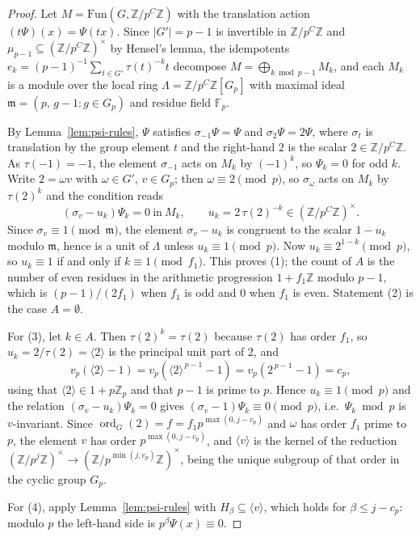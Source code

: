 \documentclass[a4paper]{article}
\newcommand{\F}{\mathbb{F}}
\newcommand{\Z}{\mathbb{Z}}
\newcommand{\ord}[2][]{\operatorname{ord}_{#1}\!\left(#2\right)}
\newcommand{\abs}[1]{\left|#1\right|}
\begin{document}
\begin{proof}
	Let $M=\mathrm{Fun}(G,\Z/p^{C}\Z)$ with the translation action
	$(t\Psi)(x)=\Psi(tx)$.  Since $\abs{G'}=p-1$ is invertible in
	$\Z/p^{C}\Z$ and $\mu_{p-1}\subseteq(\Z/p^{C}\Z)^{\times}$ by Hensel's
	lemma, the idempotents
	$e_k=(p-1)^{-1}\sum_{t\in G'}\tau(t)^{-k}t$ decompose
	$M=\bigoplus_{k\bmod p-1}M_k$, and each $M_k$ is a module over the
	local ring $\Lambda=\Z/p^{C}\Z[G_p]$ with maximal ideal
	$\mathfrak m=(p,\,g-1:g\in G_p)$ and residue field $\F_p$.

	By Lemma~\ref{lem:psi-rules}, $\Psi$ satisfies $\sigma_{-1}\Psi=\Psi$
	and $\sigma_2\Psi=2\Psi$, where $\sigma_t$ is translation by the group
	element $t$ and the right-hand $2$ is the scalar $2\in\Z/p^{C}\Z$.
	As $\tau(-1)=-1$, the element $\sigma_{-1}$ acts on $M_k$ by
	$(-1)^{k}$, so $\Psi_k=0$ for odd $k$.
	Write $2=\omega v$ with $\omega\in G'$, $v\in G_p$; then
	$\omega\equiv2\pmod p$, so $\sigma_\omega$ acts on $M_k$ by
	$\tau(2)^{k}$ and the condition reads
	\[
		\left(\sigma_v-u_k\right)\Psi_k=0\ \text{in}\ M_k,
		\qquad u_k=2\,\tau(2)^{-k}\in(\Z/p^{C}\Z)^{\times}.
	\]
	Since $\sigma_v\equiv1\pmod{\mathfrak m}$, the element
	$\sigma_v-u_k$ is congruent
	to the scalar $1-u_k$ modulo $\mathfrak m$, hence is a unit of
	$\Lambda$ unless $u_k\equiv1\pmod p$.
	Now $u_k\equiv2^{1-k}\pmod p$, so $u_k\equiv1$ if and only if
	$k\equiv1\pmod{f_1}$.  This proves (1); the count of $A$ is the number
	of even residues in the arithmetic progression $1+f_1\Z$ modulo
	$p-1$, which is $(p-1)/(2f_1)$ when $f_1$ is odd and $0$ when $f_1$ is
	even.  Statement (2) is the case $A=\emptyset$.

	For (3), let $k\in A$.  Then $\tau(2)^{k}=\tau(2)$ because $\tau(2)$
	has order $f_1$, so $u_k=2/\tau(2)=\langle2\rangle$ is the principal
	unit part of $2$, and
	\[
		v_p\!\left(\langle2\rangle-1\right)
		=v_p\!\left(\langle2\rangle^{\,p-1}-1\right)
		=v_p\!\left(2^{\,p-1}-1\right)=c_p ,
	\]
	using that $\langle2\rangle\in1+p\Z_p$ and that $p-1$ is prime to $p$.
	Hence $u_k\equiv1\pmod p$ and the relation
	$(\sigma_v-u_k)\Psi_k=0$ gives
	$(\sigma_v-1)\Psi_k\equiv0\pmod p$, i.e.\ $\Psi_k\bmod p$ is
	$v$-invariant.  Since $\ord[G]{2}=f=f_1p^{\max(0,j-c_p)}$ and $\omega$
	has order $f_1$ prime to $p$, the element $v$ has order
	$p^{\max(0,j-c_p)}$, and $\langle v\rangle$ is the kernel of the
	reduction $(\Z/p^{j}\Z)^{\times}\to(\Z/p^{\min(j,c_p)}\Z)^{\times}$,
	being the unique subgroup of that order in the cyclic group $G_p$.

	For (4), apply Lemma~\ref{lem:psi-rules} with $H_\beta\subseteq
	\langle v\rangle$, which holds for $\beta\leq j-c_p$: modulo $p$ the
	left-hand side is $p^{\beta}\Psi(x)\equiv0$.
\end{proof}
\end{document}
